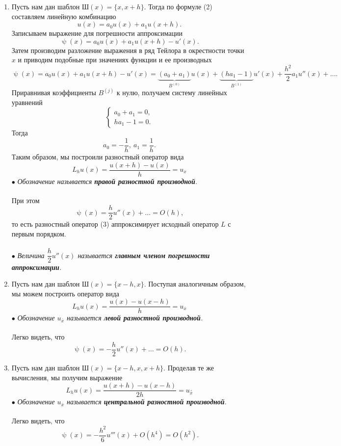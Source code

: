 \documentclass[a4paper, 12pt]{report}
\numberwithin{equation}{section}
\newcommand{\ol}{\overline}
\renewcommand{\psi}{\uppsi}
\begin{document}
\begin{enumerate}
\item Пусть нам дан шаблон $\text{Ш}(x) = \{x, x+h\}$. Тогда по формуле (2) составляем линейную комбинацию
$$u(x) = a_0 u(x) + a_1u(x+h).$$
Записываем выражение для погрешности аппроксимации
$$\psi(x)= a_0u(x) + a_1u(x+h) - u'(x).$$
Затем производим разложение выражения в ряд Тейлора в окрестности точки $x$ и приводим подобные при значениях функции и ее производных
$$\psi(x)= a_0u(x) + a_1u(x+h) - u'(x) = \underbrace{(a_0+a_1)}_{B ^{(0)}}u(x) + \underbrace{(ha_1 - 1)}_{B^{(1)}} u'(x) + \dfrac{h^2}{2} a_1 u''(x) + \ldots.$$
Приравнивая коэффициенты $B^{(j)}$ к нулю, получаем систему линейных уравнений 
$$\begin{cases}
	a_0+a_1 = 0,\\
	ha_1 - 1= 0.
\end{cases}$$
Тогда $$a_0 = -\dfrac 1h,\ a_1 = \dfrac 1h.$$
Таким образом, мы построили разностный оператор вида 
\begin{equation}
	L_hu(x) = \dfrac{u(x+h) - u(x)}{h} = u_x
\end{equation}
$\bullet$ \textit{Обозначение называется \textbf{правой разностной производной}.}\\\\
При этом $$\psi(x) = \dfrac h2 u''(x) + \ldots = O(h),$$ то есть разностный оператор (3) аппроксимирует исходный оператор $L$ с первым порядком.\\\\
$\bullet$ \textit{Величина $\dfrac h 2 u''(x)$ называется \textbf{главным членом погрешности аппроксимации}.}
\item Пусть нам дан шаблон $\text{Ш}(x) = \{x-h, x\}$. Поступая аналогичным образом, мы можем построить оператор вида 
\begin{equation}
	L_hu(x) = \dfrac{u(x) - u(x-h)}{h} = u_{\ol x}
\end{equation}
$\bullet$ \textit{Обозначение $u_{\ol x}$ называется \textbf{левой разностной производной}. }
\\\\
Легко видеть, что $$\psi(x) = -\dfrac h2 u''(x) + \ldots = O(h).$$ 
\item Пусть нам дан шаблон $\text{Ш}(x) = \{x-h, x, x+h\}$. Проделав те же вычисления, мы получим выражение 
\begin{equation}
	L_hu(x) = \dfrac{u(x+h) - u(x-h)}{2h} = u_{\overset\circ x}
\end{equation}
$\bullet$ \textit{Обозначение $u_{\ol x}$ называется \textbf{центральной разностной производной}.}
\\\\
Легко видеть, что $$\psi(x) = -\dfrac {h^2}{6} u'''(x) + O(h^4) = O(h^2).$$ 
\end{enumerate}
\end{document}
